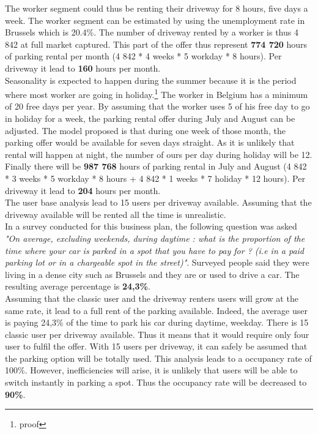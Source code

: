 \documentclass[12pt,a4paper,oneside]{book}
\begin{document}
The worker segment could thus be renting their driveway for 8 hours, five days a week. The worker segment can be estimated by using the unemployment rate in Brussels which is 20.4\%.\cite{unemploybx} The number of driveway rented by a worker is thus 4 842 at full market captured. This part of the offer thus represent \textbf{774 720} hours of parking rental per month (4 842 * 4 weeks * 5 workday * 8 hours). Per driveway it lead to \textbf{160} hours per month.\\

Seasonality is expected to happen during the summer because it is the period where most worker are going in holiday.\footnote{proof} The worker in Belgium has a minimum of 20 free days per year.\cite{hdbe} By assuming that the worker uses 5 of his free day to go in holiday for a week, the parking rental offer during July and August can be adjusted.\cite{hdbe} The model proposed is that during one week of those month, the parking offer would be available for seven days straight. As it is unlikely that rental will happen at night, the number of ours per day during holiday will be 12. Finally there will be \textbf{987 768} hours of parking rental in July and August (4 842 * 3 weeks * 5 workday * 8 hours + 4 842 * 1 weeks * 7 holiday * 12 hours). Per driveway it lead to \textbf{204} hours per month.\\

The user base analysis lead to 15 users per driveway available. Assuming that the driveway available will be rented all the time is unrealistic.\\

In a survey conducted for this business plan, the following question was asked \textit{"On average, excluding weekends, during daytime : what is the proportion of the time where your car is parked in a spot that you have to pay for ? (i.e in a paid parking lot or in a chargeable spot in the street)"}. Surveyed people said they were living in a dense city such as Brussels and they are or used to drive a car. The resulting average percentage is \textbf{24,3\%}.\\

Assuming that the classic user and the driveway renters users will grow at the same rate, it lead to a full rent of the parking available. Indeed, the average user is paying 24,3\% of the time to park his car during daytime, weekday. There is 15 classic user per driveway available. Thus it means that it would require only four user to fulfil the offer. With 15 users per driveway, it can safely be assumed that the parking option will be totally used. This analysis leads to a occupancy rate of 100\%. However, inefficiencies will arise, it is unlikely that users will be able to switch instantly in parking a spot. Thus the occupancy rate will be decreased to \textbf{90\%}.
\end{document}
